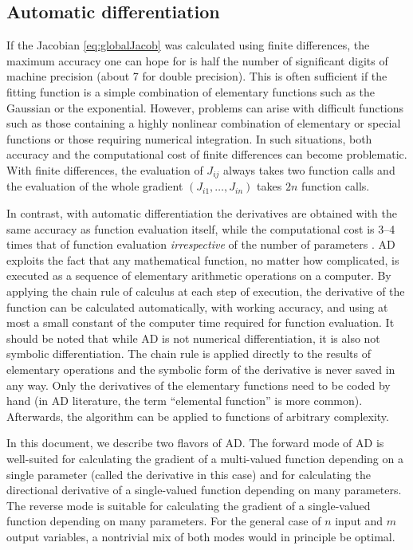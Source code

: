 \documentclass{article}
\begin{document}
\subsection{\label{sec:ad}Automatic differentiation}

If the Jacobian \eqref{eq:globalJacob} was calculated using finite differences, the maximum accuracy one can hope for is half the number of significant digits of machine precision (about 7 for double precision). This is often sufficient if the fitting function is a simple combination of elementary functions such as the Gaussian or the exponential. However, problems can arise with difficult functions such as those containing a highly nonlinear combination of elementary or special functions or those requiring numerical integration. In such situations, both accuracy and the computational cost of finite differences can become problematic. With finite differences, the evaluation of $J_{ij}$ always takes two function calls and the evaluation of the whole gradient $(J_{i1}, \ldots, J_{in})$ takes $2n$ function calls.

In contrast, with automatic differentiation the derivatives are obtained with the same accuracy as function evaluation itself, while the computational cost is 3--4 times that of function evaluation \textit{irrespective} of the number of parameters \cite{griewank08}. AD exploits the fact that any mathematical function, no matter how complicated, is executed as a sequence of elementary arithmetic operations on a computer. By applying the chain rule of calculus at each step of execution, the derivative of the function can be calculated automatically, with working accuracy, and using at most a small constant of the computer time required for function evaluation. It should be noted that while AD is not numerical differentiation, it is also not symbolic differentiation. The chain rule is applied directly to the results of elementary operations and the symbolic form of the derivative is never saved in any way. Only the derivatives of the elementary functions need to be coded by hand (in AD literature, the term ``elemental function'' is more common). Afterwards, the algorithm can be applied to functions of arbitrary complexity.

In this document, we describe two flavors of AD. The forward mode of AD is well-suited for calculating the gradient of a multi-valued function depending on a single parameter (called the derivative in this case) and for calculating the directional derivative of a single-valued function depending on many parameters. The reverse mode is suitable for calculating the gradient of a single-valued function depending on many parameters. For the general case of $n$ input and $m$ output variables, a nontrivial mix of both modes would in principle be optimal.
\end{document}
